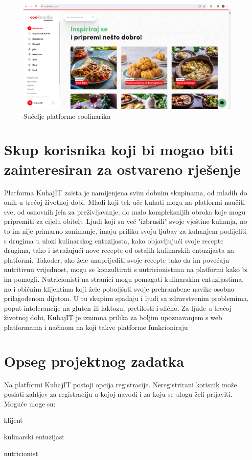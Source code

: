 				\begin{figure}[H]
			\includegraphics[scale=0.4]{slike/coolinarika.PNG} %
			\centering
			\caption{Sučelje platforme coolinarika}
			\label{coolinarika}
		\end{figure}
		
		\section{Skup korisnika koji bi mogao biti zainteresiran za ostvareno rješenje}
		
		Platforma KuhajIT zaista je namijenjena svim dobnim skupinama, od mladih do onih u trećoj životnoj dobi. Mladi koji tek uče kuhati mogu na platformi naučiti sve, od osnovnih jela za preživljavanje, do malo kompleksnijih obroka koje mogu pripremiti za cijelu obitelj. Ljudi koji su već "izbrusili" svoje vještine kuhanja, no to im nije primarno zanimanje, imaju priliku svoju ljubav za kuhanjem podijeliti s drugima u ulozi kulinarskog entuzijasta, kako objavljujući svoje recepte drugima, tako i istražujući nove recepte od ostalih kulinarskih entuzijasta na platformi. Također, ako žele unaprijediti svoje recepte tako da im povećaju nutritivnu vrijednost, mogu se konzultirati s nutricionistima na platformi kako bi im pomogli. Nutricionisti na stranici mogu pomagati kulinarskim entuzijastima, no i običnim klijentima koji žele poboljšati svoje prehrambene navike osobno prilagođenom dijetom. U tu skupinu spadaju i ljudi sa zdravstvenim problemima, poput intolerancije na gluten ili laktozu, pretilosti i slično. Za ljude u trećoj životnoj dobi, KuhajIT je iznimna prilika za boljim upoznavanjem s web platformama i načinom na koji takve platforme funkcioniraju
		
		\section{Opseg projektnog zadatka}
		Na platformi KuhajIT postoji opcija registracije.
		Neregistrirani korisnik može poslati zahtjev za registraciju u kojoj navodi i za koju se ulogu želi prijaviti. Moguće uloge su:
		\begin{packed_item}
		    \item klijent
		    \item kulinarski entuzijast
		    \item nutricionist
		\end{packed_item}
		

